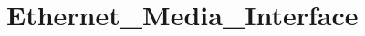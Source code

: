 \hypertarget{group___ethernet___media___interface}{\section{Ethernet\-\_\-\-Media\-\_\-\-Interface}
\label{group___ethernet___media___interface}
}
